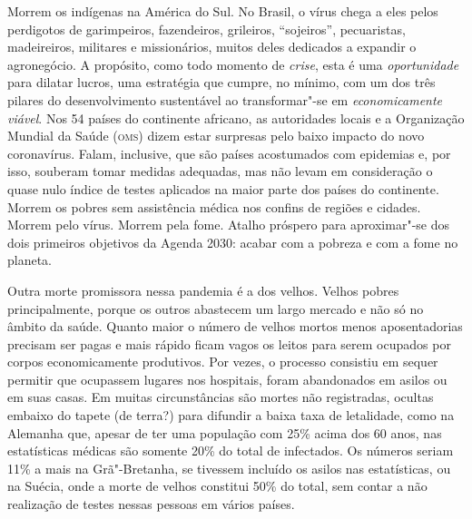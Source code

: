 Morrem os indígenas na América do Sul. No Brasil, o vírus chega a eles
pelos perdigotos de garimpeiros, fazendeiros, grileiros, ``sojeiros'',
pecuaristas, madeireiros, militares e missionários, muitos deles
dedicados a expandir o agronegócio. A propósito, como todo momento de
\emph{crise}, esta é uma \emph{oportunidade} para dilatar lucros, uma
estratégia que cumpre, no mínimo, com um dos três pilares do
desenvolvimento sustentável ao transformar"-se em \emph{economicamente
viável}. Nos 54 países do continente africano, as autoridades locais e a
Organização Mundial da Saúde (\textsc{oms}) dizem estar surpresas pelo baixo
impacto do novo coronavírus. Falam, inclusive, que são países
acostumados com epidemias e, por isso, souberam tomar medidas adequadas,
mas não levam em consideração o quase nulo índice de testes aplicados na
maior parte dos países do continente. Morrem os pobres sem assistência
médica nos confins de regiões e cidades. Morrem pelo vírus. Morrem pela
fome. Atalho próspero para aproximar"-se dos dois primeiros objetivos da
Agenda 2030: acabar com a pobreza e com a fome no
planeta.

Outra morte promissora nessa pandemia é a dos velhos. Velhos pobres
principalmente, porque os outros abastecem um largo mercado e não só no
âmbito da saúde. Quanto maior o número de velhos mortos menos
aposentadorias precisam ser pagas e mais rápido ficam vagos os leitos
para serem ocupados por corpos economicamente produtivos. Por vezes, o
processo consistiu em sequer permitir que ocupassem lugares nos
hospitais, foram abandonados em asilos ou em suas casas. Em muitas
circunstâncias são mortes não registradas, ocultas embaixo do tapete (de
terra?) para difundir a baixa taxa de letalidade, como na Alemanha que,
apesar de ter uma população com 25\% acima dos 60 anos, nas estatísticas
médicas são somente 20\% do total de infectados. Os números seriam 11\%
a mais na Grã"-Bretanha, se tivessem incluído os asilos nas estatísticas,
ou na Suécia, onde a morte de velhos constitui 50\% do total, sem contar
a não realização de testes nessas pessoas em vários países.

